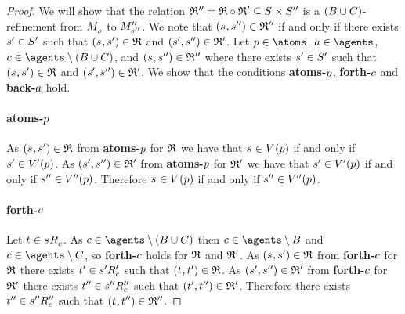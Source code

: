 \begin{proof}
    We will show that the relation $\refinement'' = \refinement \circ \refinement' \subseteq \kStates \times \kStatesPP$ is a $(B \cup C)$-refinement from $\kPModel{\kStateS}$ to ${M^{\prime\prime}_{{s}^{\prime\prime}}}$.
We note that $(\kStateS, \kStateSPP) \in \refinement''$ if and only if there exists ${s}^{\prime} \in {S^{\prime}}$ such that $(\kStateS, \kStateSP) \in \refinement$ and $({s}^{\prime}, {s}^{\prime\prime}) \in \mathfrak{R}'$.
Let $\atomP \in \atoms$, $\agentA \in \agents$, $\agentC \in \agents \setminus (\agentsB \cup \agentsC)$, and $(\kStateS, \kStateSPP) \in \refinement''$ where there exists ${s}^{\prime} \in {S^{\prime}}$ such that $(\kStateS, \kStateSP) \in \refinement$ and $({s}^{\prime}, {s}^{\prime\prime}) \in \mathfrak{R}'$.
We show that the conditions {\bf atoms-$p$}, {\bf forth-$c$} and {\bf back-$a$} hold.

\paragraph{atoms-$p$}
As $(\kStateS, \kStateSP) \in \refinement$ from {\bf atoms-$p$} for $\mathfrak{R}$ we have that $\kStateS \in \kValuation(\atomP)$ if and only if ${s}^{\prime} \in {V^{\prime}}(p)$.
As $({s}^{\prime}, {s}^{\prime\prime}) \in \mathfrak{R}'$ from {\bf atoms-$p$} for $\mathfrak{R}'$ we have that ${s}^{\prime} \in {V^{\prime}}(p)$ if and only if ${s}^{\prime\prime} \in {V^{\prime\prime}}(p)$.
Therefore $\kStateS \in \kValuation(\atomP)$ if and only if ${s}^{\prime\prime} \in {V^{\prime\prime}}(p)$.

\paragraph{forth-$c$}
Let $\kStateT \in \kSuccessorsC{\kStateS}$.
As $\agentC \in \agents \setminus (\agentsB \cup \agentsC)$ then $\agentC \in \agents \setminus \agentsB$ and $\agentC \in \agents \setminus \agentsC$, so {\bf forth-$c$} holds for $\mathfrak{R}$ and $\mathfrak{R}'$.
As $(\kStateS, \kStateSP) \in \refinement$ from {\bf forth-$c$} for $\mathfrak{R}$ there exists ${t}^{\prime} \in {{s}^{\prime}} {R^{\prime}_{c}}$ such that $(\kStateT, \kStateTP) \in \refinement$.
As $({s}^{\prime}, {s}^{\prime\prime}) \in \mathfrak{R}'$ from {\bf forth-$c$} for $\mathfrak{R}'$ there exists ${t}^{\prime\prime} \in {{s}^{\prime\prime}} {R^{\prime\prime}_{c}}$ such that $({t}^{\prime}, {t}^{\prime\prime}) \in \mathfrak{R}'$.
Therefore there exists ${t}^{\prime\prime} \in {{s}^{\prime\prime}} {R^{\prime\prime}_{c}}$ such that $(\kStateT, \kStateTPP) \in \refinement''$.


\end{proof}
